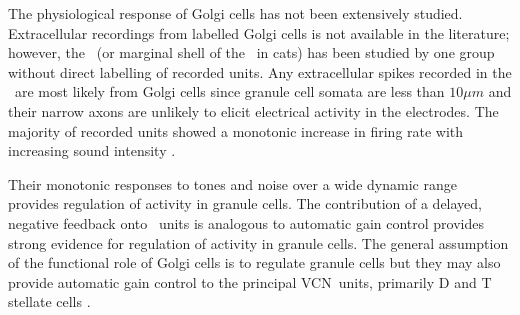 The physiological response of Golgi cells has not been extensively studied.
Extracellular recordings from labelled Golgi cells is not available in the literature; however, the \GCD~(or marginal shell of the \VCN~in cats) has been studied by one group \citet{GhoshalKim:1997} without direct labelling of recorded units.
Any extracellular spikes recorded in the \GCD~are most likely from Golgi cells since granule cell somata are less than $10 \mu{m}$ and their narrow axons are unlikely to elicit electrical activity in the electrodes.
The majority of recorded units showed a monotonic increase in firing rate with increasing sound intensity \citep[Figure~\ref{fig:GolgiKimFig2}][]{GhoshalKim:1997}.


Their monotonic responses to tones and noise over a wide dynamic range provides regulation of activity in granule cells.
The contribution of a delayed, negative feedback onto \VCN~units is analogous to automatic gain control provides strong evidence for regulation of activity in granule cells. The general assumption of the functional role of Golgi cells is to regulate granule cells but they may also provide automatic gain control to the principal VCN~units, primarily D and T stellate cells \citep{FerragamoGoldingEtAl:1998a}.

    
    

